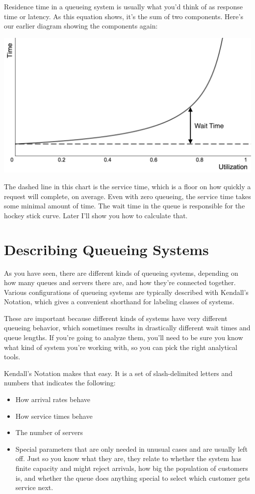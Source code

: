 \documentclass{vivid_layout}
\begin{document}
Residence time in a queueing system is usually what you'd think of as response time or latency. As this equation shows, it's the sum of two components.  Here's our earlier diagram showing the components again:

\begin{center}
\includegraphics[width=.75\linewidth]{queueing-theory/hockey-stick-1}
\end{center}

The dashed line in this chart is the service time, which is a floor on how quickly a request will complete, on average. Even with zero queueing, the service time takes some minimal amount of time. The wait time in the queue is responsible for the hockey stick curve. Later I'll show you how to calculate that.

\section{Describing Queueing Systems}

As you have seen, there are different kinds of queueing systems, depending on how many queues and servers there are, and how they're connected together. Various configurations of queueing systems are typically described with Kendall's Notation, which gives a convenient shorthand for labeling classes of systems.

These are important because different kinds of systems have very different queueing behavior, which sometimes results in drastically different wait times and queue lengths. If you're going to analyze them, you'll need to be sure you know what kind of system you're working with, so you can pick the right analytical tools.

Kendall's Notation makes that easy. It is a set of slash-delimited letters and numbers that indicates the following:

\begin{itemize}
\item How arrival rates behave
\item How service times behave
\item The number of servers
\item Special parameters that are only needed in unusual cases and are usually left off. Just so you know what they are, they relate to whether the system has finite capacity and might reject arrivals, how big the population of customers is, and whether the queue does anything special to select which customer gets service next.
\end{itemize}
\end{document}
